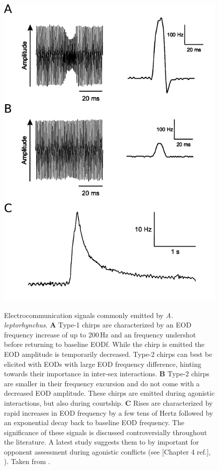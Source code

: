 \documentclass[11pt,pdftex]{article}
\newcommand{\figitem}[1]{\textsf{\bfseries\uppercase{#1}}\penalty10000 }
\newcommand{\note}[2][]{\textcolor{red!80!black}{[\textbf{\ifthenelse{\equal{#1}{}}{}{#1: }}#2]}}
\newcommand{\notetr}[1]{\note[TR]{#1}}
\newcommand{\lepto}{\textit{A. leptorhynchus}}
\begin{document}
\begin{figure}[tp]
  \begin{minipage}[t]{0.45\textwidth}\mbox{}\\[-2ex]
    \includegraphics{e_communication}
  \end{minipage}
  \hfill
  \begin{minipage}[t]{0.45\textwidth}
  \caption{\label{e_com_sigs} Electrocommunication signals commonly emitted by \lepto{}. \figitem{A} Type-1 chirps are characterized by an EOD frequency increase of up to 200\,Hz and an frequency undershot before returning to baseline EODf. While the chirp is emitted the EOD amplitude is temporarily decreased. Type-2 chirps can best be elicited with EODs with large EOD frequency difference, hinting towards their importance in inter-sex interactions. \figitem{B} Type-2 chirps are smaller in their frequency excursion and do not come with a decreased EOD amplitude. These chirps are emitted during agonistic interactions, but also during courtship. \figitem{C} Rises are characterized by rapid increases in EOD frequency by a few tens of Hertz followed by an exponential decay back to baseline EOD frequency. The significance of these signals is discussed controversially throughout the literature. A latest study suggests them to by important for opponent assessment during agonistic conflicts (see \notetr{Chapter 4 ref.}, \citealp{Raab2021}). Taken from \citet{Zupanc2002}.}
  \end{minipage}
\end{figure}
\end{document}
